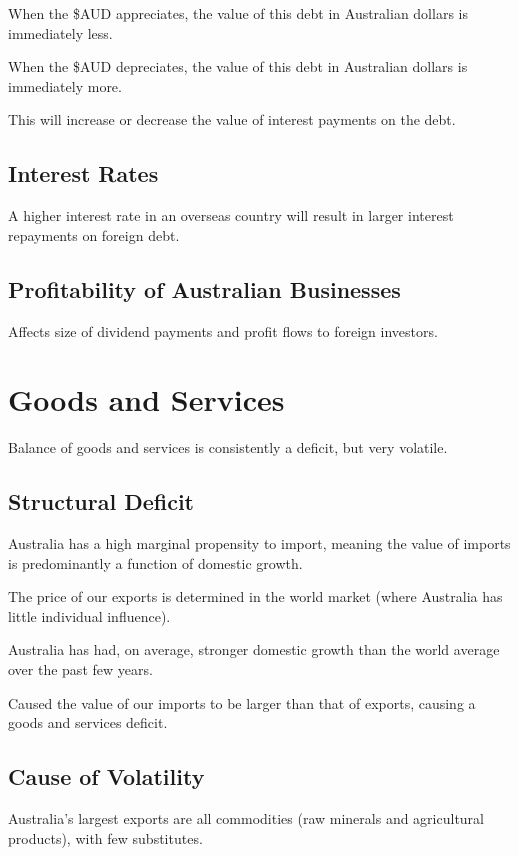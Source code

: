 \documentclass[a4paper,11pt]{report}
\begin{document}
When the \$AUD appreciates, the value of this debt in Australian dollars is
immediately less.

When the \$AUD depreciates, the value of this debt in Australian dollars is
immediately more.

This will increase or decrease the value of interest payments on the debt.

\subsection{Interest Rates}

A higher interest rate in an overseas country will result in larger interest
repayments on foreign debt.

\subsection{Profitability of Australian Businesses}

Affects size of dividend payments and profit flows to foreign investors.


\section{Goods and Services}

Balance of goods and services is consistently a deficit, but very volatile.

\subsection{Structural Deficit}

Australia has a high marginal propensity to import, meaning the value of
imports is predominantly a function of domestic growth.

The price of our exports is determined in the world market (where Australia has
little individual influence).

Australia has had, on average, stronger domestic growth than the world average
over the past few years.

Caused the value of our imports to be larger than that of exports, causing a
goods and services deficit.

\subsection{Cause of Volatility}

Australia's largest exports are all commodities (raw minerals and agricultural
products), with few substitutes.
\end{document}

